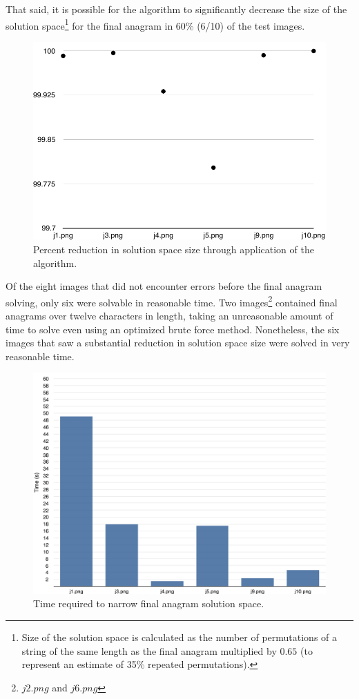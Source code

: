 \documentclass{article}
\begin{document}
	That said, it is possible for the algorithm to significantly decrease the size of the solution space\footnote{Size of the solution space is calculated as the number of permutations of a string of the same length as the final anagram multiplied by $0.65$ (to represent an estimate of 35\% repeated permutations).} for the final anagram in 60\% (6/10) of the test images.  \par 
	
	\begin{figure}[h]
		\centering
		\includegraphics[width=.85\textwidth]{graph}
		\caption{Percent reduction in solution space size through application of the algorithm.}
	\end{figure}

	Of the eight images that did not encounter errors before the final anagram solving, only six were solvable in reasonable time.  Two images\footnote{$j2.png$ and $j6.png$} contained final anagrams over twelve characters in length, taking an unreasonable amount of time to solve even using an optimized brute force method.  Nonetheless, the six images that saw a substantial reduction in solution space size were solved in very reasonable time.
	
	\begin{figure}[h]
		\centering
		\includegraphics[width=.85\textwidth]{time}
		\caption{Time required to narrow final anagram solution space.}
	\end{figure}
	
\end{document}
